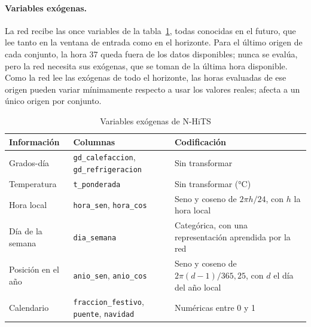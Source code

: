 \paragraph{Variables exógenas.} La red recibe las once variables de la
tabla~\ref{tab:exogenas-nhits}, todas conocidas en el futuro, que lee tanto en
la ventana de entrada como en el horizonte. Para el último origen de cada
conjunto, la hora 37 queda fuera de los datos disponibles; nunca se evalúa,
pero la red necesita sus exógenas, que se toman de la última hora disponible.
Como la red lee las exógenas de todo el horizonte, las horas evaluadas de ese
origen pueden variar mínimamente respecto a usar los valores reales; afecta a
un único origen por conjunto.

\begin{table}[htbp]
	\centering
	\caption{Variables exógenas de N-HiTS}
	\label{tab:exogenas-nhits}
	\small
	\begin{tabularx}{\textwidth}{>{\raggedright\arraybackslash}p{3.3cm} >{\raggedright\arraybackslash}p{5cm} >{\raggedright\arraybackslash}X}
		\hline
		\textbf{Información} & \textbf{Columnas} & \textbf{Codificación} \\
		\hline
		Grados-día & \texttt{gd\_calefaccion}, \texttt{gd\_refrigeracion} & Sin transformar \\
		Temperatura & \texttt{t\_ponderada} & Sin transformar (°C) \\
		Hora local & \texttt{hora\_sen}, \texttt{hora\_cos} & Seno y coseno de $2\pi h/24$, con $h$ la hora local \\
		Día de la semana & \texttt{dia\_semana} & Categórica, con una representación aprendida por la red \\
		Posición en el año & \texttt{anio\_sen}, \texttt{anio\_cos} & Seno y coseno de $2\pi (d-1)/365{,}25$, con $d$ el día del año local \\
		Calendario & \texttt{fraccion\_festivo}, \texttt{puente}, \texttt{navidad} & Numéricas entre 0 y 1 \\
		\hline
	\end{tabularx}
\end{table}

